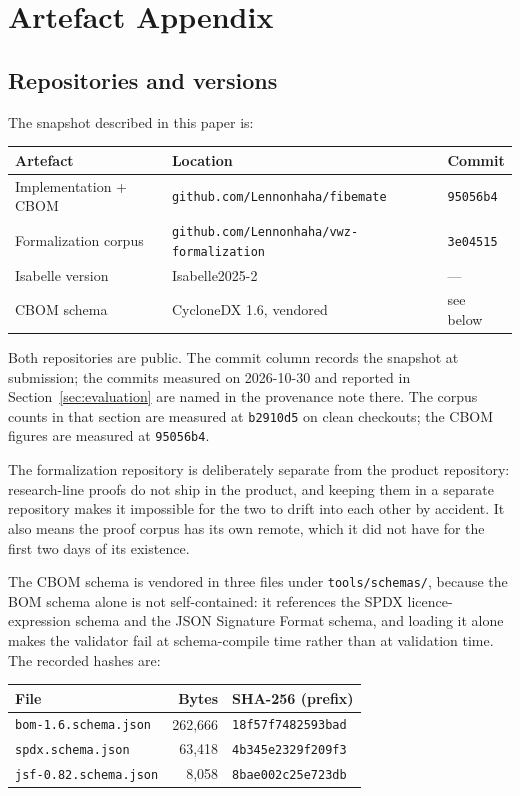 \section{Artefact Appendix}
\label{app:artefacts}

\subsection{Repositories and versions}

The snapshot described in this paper is:

\begin{center}
\begin{tabular}{@{}lll@{}}
\toprule
Artefact & Location & Commit \\
\midrule
Implementation + CBOM & \texttt{github.com/Lennonhaha/fibemate} & \texttt{95056b4} \\
Formalization corpus & \texttt{github.com/Lennonhaha/vwz-formalization} & \texttt{3e04515} \\
Isabelle version & Isabelle2025-2 & --- \\
CBOM schema & CycloneDX 1.6, vendored & see below \\
\bottomrule
\end{tabular}
\end{center}

Both repositories are public. The commit column records the snapshot at
submission; the commits measured on 2026-10-30 and reported in
Section~\ref{sec:evaluation} are named in the provenance note there. The corpus
counts in that section are measured at \texttt{b2910d5} on clean checkouts; the
CBOM figures are measured at \texttt{95056b4}.

The formalization repository is deliberately
separate from the product repository: research-line proofs do not ship in the
product, and keeping them in a separate repository makes it impossible for the
two to drift into each other by accident. It also means the proof corpus has its
own remote, which it did not have for the first two days of its existence.

The CBOM schema is vendored in three files under \texttt{tools/schemas/},
because the BOM schema alone is not self-contained: it references the SPDX
licence-expression schema and the JSON Signature Format schema, and loading it
alone makes the validator fail at schema-compile time rather than at validation
time. The recorded hashes are:

\begin{center}
\begin{tabular}{@{}lrl@{}}
\toprule
File & Bytes & SHA-256 (prefix) \\
\midrule
\texttt{bom-1.6.schema.json} & 262{,}666 & \texttt{18f57f7482593bad} \\
\texttt{spdx.schema.json} & 63{,}418 & \texttt{4b345e2329f209f3} \\
\texttt{jsf-0.82.schema.json} & 8{,}058 & \texttt{8bae002c25e723db} \\
\bottomrule
\end{tabular}
\end{center}

